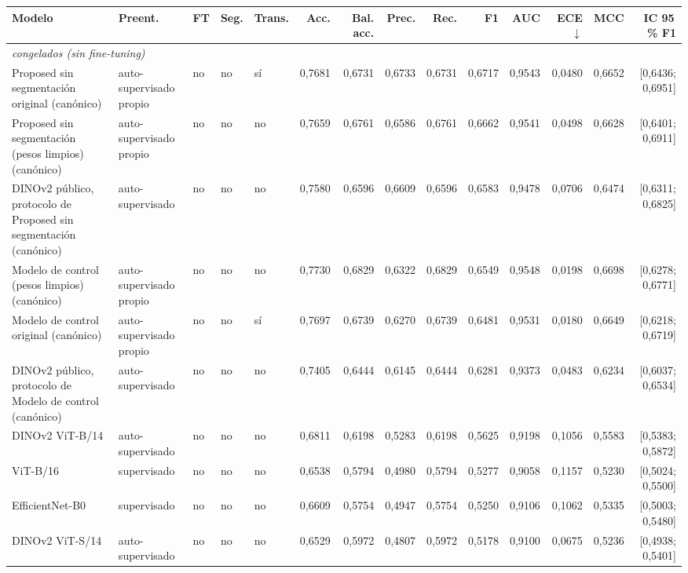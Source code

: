 \begin{table}[ht]
\centering
\scriptsize
\setlength{\tabcolsep}{3pt}
\begin{tabular}{@{}lllllrrrrrrrrr@{}}
\toprule
Modelo & Preent. & FT & Seg. & Trans. & Acc. & Bal. acc. & Prec. & Rec. & F1 & AUC & ECE$\downarrow$ & MCC & IC 95\,\% F1 \\
\midrule
\multicolumn{14}{l}{\textit{congelados (sin fine-tuning)}} \\
\midrule
Proposed sin segmentación original (canónico) & auto-supervisado propio & no & no & sí & 0,7681 & 0,6731 & 0,6733 & 0,6731 & 0,6717 & 0,9543 & 0,0480 & 0,6652 & [0,6436; 0,6951] \\
Proposed sin segmentación (pesos limpios) (canónico) & auto-supervisado propio & no & no & no & 0,7659 & 0,6761 & 0,6586 & 0,6761 & 0,6662 & 0,9541 & 0,0498 & 0,6628 & [0,6401; 0,6911] \\
DINOv2 público, protocolo de Proposed sin segmentación (canónico) & auto-supervisado & no & no & no & 0,7580 & 0,6596 & 0,6609 & 0,6596 & 0,6583 & 0,9478 & 0,0706 & 0,6474 & [0,6311; 0,6825] \\
Modelo de control (pesos limpios) (canónico) & auto-supervisado propio & no & no & no & 0,7730 & 0,6829 & 0,6322 & 0,6829 & 0,6549 & 0,9548 & 0,0198 & 0,6698 & [0,6278; 0,6771] \\
Modelo de control original (canónico) & auto-supervisado propio & no & no & sí & 0,7697 & 0,6739 & 0,6270 & 0,6739 & 0,6481 & 0,9531 & 0,0180 & 0,6649 & [0,6218; 0,6719] \\
DINOv2 público, protocolo de Modelo de control (canónico) & auto-supervisado & no & no & no & 0,7405 & 0,6444 & 0,6145 & 0,6444 & 0,6281 & 0,9373 & 0,0483 & 0,6234 & [0,6037; 0,6534] \\
DINOv2 ViT-B/14 & auto-supervisado & no & no & no & 0,6811 & 0,6198 & 0,5283 & 0,6198 & 0,5625 & 0,9198 & 0,1056 & 0,5583 & [0,5383; 0,5872] \\
ViT-B/16 & supervisado & no & no & no & 0,6538 & 0,5794 & 0,4980 & 0,5794 & 0,5277 & 0,9058 & 0,1157 & 0,5230 & [0,5024; 0,5500] \\
EfficientNet-B0 & supervisado & no & no & no & 0,6609 & 0,5754 & 0,4947 & 0,5754 & 0,5250 & 0,9106 & 0,1062 & 0,5335 & [0,5003; 0,5480] \\
DINOv2 ViT-S/14 & auto-supervisado & no & no & no & 0,6529 & 0,5972 & 0,4807 & 0,5972 & 0,5178 & 0,9100 & 0,0675 & 0,5236 & [0,4938; 0,5401] \\

\end{tabular}
\end{table}
